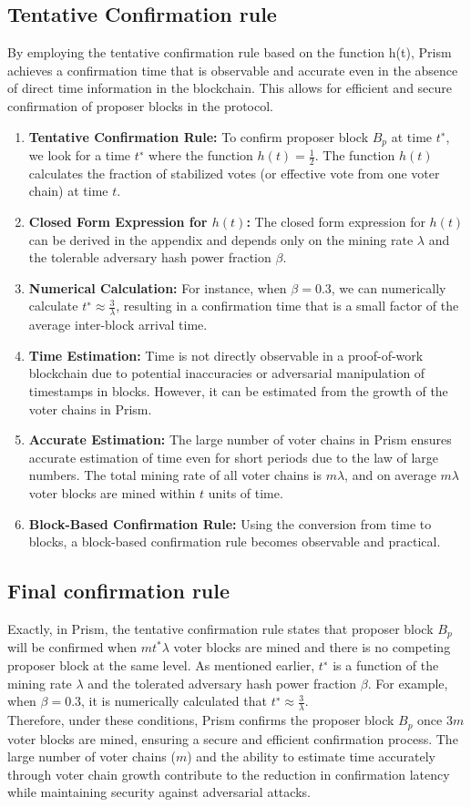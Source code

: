 \subsection{Tentative Confirmation rule}
By employing the tentative confirmation rule based on the function h(t), Prism achieves a confirmation time that is observable and accurate even in the absence of direct time information in the blockchain. This allows for efficient and secure confirmation of proposer blocks in the protocol.\\
\begin{enumerate}
	\item \textbf{Tentative Confirmation Rule:}  To confirm proposer block $B_{p}$ at time $t^{∗}$, we look for a time $t^{∗}$ where the function $h(t) = \frac{1}{2}$. The function $h(t)$ calculates the fraction of stabilized votes (or effective vote from one voter chain) at time $t$.
	\item \textbf{Closed Form Expression for $h(t)$:} The closed form expression for $h(t)$ can be derived in the appendix and depends only on the mining rate $\lambda$ and the tolerable adversary hash power fraction $\beta$.
	\item \textbf{Numerical Calculation:} For instance, when $\beta = 0.3$, we can numerically calculate $t^{∗} ≈ \frac{3}{\lambda}$, resulting in a confirmation time that is a small factor of the average inter-block arrival time.
	\item \textbf{Time Estimation:} Time is not directly observable in a proof-of-work blockchain due to potential inaccuracies or adversarial manipulation of timestamps in blocks. However, it can be estimated from the growth of the voter chains in Prism.
	\item \textbf{Accurate Estimation:} The large number of voter chains in Prism ensures accurate estimation of time even for short periods due to the law of large numbers. The total mining rate of all voter chains is $m\lambda$, and on average $m\lambda$ voter blocks are mined within $t$ units of time.
	\item \textbf{Block-Based Confirmation Rule:} Using the conversion from time to blocks, a block-based confirmation rule becomes observable and practical.
\end{enumerate}
\subsection{Final confirmation rule}
Exactly, in Prism, the tentative confirmation rule states that proposer block $B_{p}$ will be confirmed when $mt^{*}\lambda$ voter blocks are mined and there is no competing proposer block at the same level. As mentioned earlier, $t^{∗}$ is a function of the mining rate $\lambda$ and the tolerated adversary hash power fraction $\beta$. For example, when $\beta = 0.3$, it is numerically calculated that $t^{∗} ≈ \frac{3}{\lambda}$.\\
Therefore, under these conditions, Prism confirms the proposer block $B_{p}$ once $3m$ voter blocks are mined, ensuring a secure and efficient confirmation process. The large number of voter chains ($m$) and the ability to estimate time accurately through voter chain growth contribute to the reduction in confirmation latency while maintaining security against adversarial attacks.
